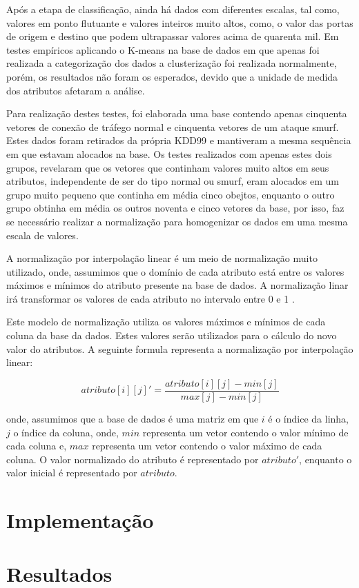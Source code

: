 \indent Após a etapa de classificação, ainda há dados com diferentes escalas, tal como, valores em ponto flutuante e valores inteiros muito altos, como, o valor das portas de origem e destino que podem ultrapassar valores acima de quarenta mil. Em testes empíricos aplicando o K-means na base de dados em que apenas foi realizada a categorização dos dados a clusterização foi realizada normalmente, porém, os resultados não foram os esperados, devido que a unidade de medida dos atributos afetaram a análise.

\indent Para realização destes testes, foi elaborada uma base contendo apenas cinquenta vetores de conexão de tráfego normal e cinquenta vetores de um ataque smurf. Estes dados foram retirados da própria KDD99 e mantiveram a mesma sequência em que estavam alocados na base. Os testes realizados com apenas estes dois grupos, revelaram que os vetores que continham valores muito altos em seus atributos, independente de ser do tipo normal ou smurf, eram alocados em um grupo muito pequeno que continha em média cinco obejtos, enquanto o outro grupo obtinha em média os outros noventa e cinco vetores da base, por isso, faz se necessário realizar a normalização para homogenizar os dados em uma mesma escala de valores.

\indent A normalização por interpolação linear é um meio de normalização muito utilizado, onde, assumimos que o domínio de cada atributo está entre os valores máximos e mínimos do atributo presente na base de dados. A normalização linar irá transformar os valores de cada atributo no intervalo entre 0 e 1 \cite{goldschmidt2005}.

\indent Este modelo de normalização utiliza os valores máximos e mínimos de cada coluna da base da dados. Estes valores serão utilizados para o cálculo do novo valor do atributos. A seguinte formula representa a normalização por interpolação linear:

\vspace{0.3cm}
\begin{equation}
\label{eq:Interpolação Linear} %
atributo[i][j]' = \frac{atributo[i][j] - min[j]}{max[j]- min[j]}
\end{equation}
\vspace{0.3cm}

\noindent onde, assumimos que a base de dados é uma matriz em que $ i $ é o índice da linha, $ j $ o índice da coluna, onde, $ min $ representa um vetor contendo o valor mínimo de cada coluna e, $ max $ representa um vetor contendo o valor máximo de cada coluna. O valor normalizado do atributo é representado por $ atributo' $, enquanto o valor inicial é representado por $ atributo $.



  \section{Implementação}

  \section{Resultados}
